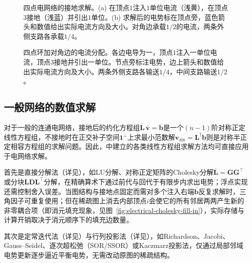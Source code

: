 \begin{figure}[!htb]
\caption{四点电网络的接地求解。(a) 在顶点$1$注入$1$单位电流（浅黄），在顶点$3$接地（浅蓝）并引出$1$单位。(b) 求解后的电势标在顶点旁，蓝色箭头和数值给出实际电流方向及大小。对角边承载$1/2$的电流，两条外侧支路各承载$1/4$。}
\label{fig:electrical-grounding-overview}
\end{figure}

\begin{figure}[htbp]
  \centering
  
  \caption{四点环加对角边的电流分配。各边电导为一，顶点$1$注入一单位电流，顶点$3$接地并引出一单位。节点旁标注电势，边上箭头和数值给出实际电流方向及大小。两条外侧支路各输送$1/4$，中间支路输送$1/2$。}
  \label{fig:electrical-current-split}
\end{figure}

\subsection{一般网络的数值求解}
\label{sec:electrical-numerical-solve}

对于一般的连通电网络，接地后的约化方程组$\overline{\bm L}\,\overline{\bm v} = \overline{\bm b}$是一个$(n-1)$阶对称正定线性方程组，不接地时在正交补子空间$\bm 1^\perp$上求最小范数解$\bm v_{\mathrm{zm}}=\bm L^\dagger\bm b$则是对称半正定相容方程组的求解问题。因此，中建立的各类线性方程组求解方法均可直接应用于电网络求解。

首先是直接分解法（详见），如LU分解、对称正定矩阵的Cholesky分解$\overline{\bm L}=\bm G\bm G^\top$或分块$\bm L\bm D\bm L^\top$分解，在精确算术下通过前代与回代于有限步内求出电势；浮点实现还需控制舍入误差。当图结构与接地点固定而需对多个注入右端$\overline{\bm b}$反复求解时，三角因子可重复使用；但在稀疏图上消去内部顶点$i$会使它的所有邻居两两产生新的非零耦合项（即消元填充现象，见图~\ref{fig:electrical-cholesky-fill-in}），实际存储与计算开销取决于消元顺序下的填充边数量。

其次是定常迭代法（详见）与行列投影法（详见），如Richardson、Jacobi、Gauss--Seidel、逐次超松弛（SOR/SSOR）或Kaczmarz投影法，仅通过局部邻域电势更新逐步逼近平衡电势，无需改动原图的稀疏结构。

